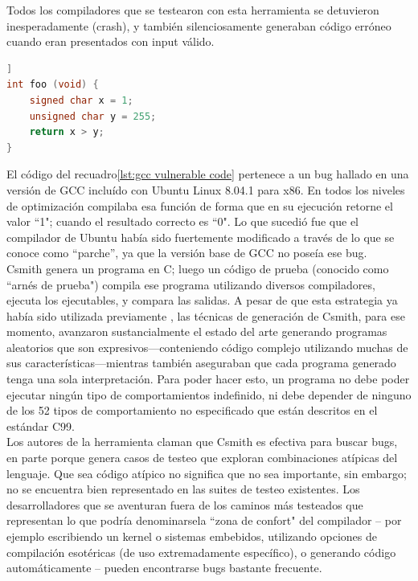 Todos los compiladores que se testearon con esta herramienta se detuvieron inesperadamente (crash), y también silenciosamente generaban código erróneo cuando eran presentados con input válido.\\

\begin{lstlisting}[language={c}, label={lst:gcc vulnerable code}, caption={Código que produjo bug en GCC}, captionpos={b}, frame={shadowbox}]]
int foo (void) {
    signed char x = 1;
    unsigned char y = 255;
    return x > y;
}
\end{lstlisting}

El código del recuadro\ref{lst:gcc vulnerable code} pertenece a un bug hallado en una versión de GCC incluído con Ubuntu Linux 8.04.1 para x86. En todos los niveles de optimización compilaba esa función  de forma que en su ejecución retorne el valor ``1"; cuando el resultado correcto es ``0". Lo que sucedió fue que el compilador de Ubuntu había sido fuertemente modificado a través de lo que se conoce como “parche”, ya que la versión base de GCC no poseía ese bug\cite{Yang:2011:FUB:1993316.1993532}.\\

Csmith genera un programa en C; luego un código de prueba (conocido como ``arnés de prueba") compila ese programa utilizando diversos compiladores, ejecuta los ejecutables, y compara las salidas. A pesar de que esta estrategia ya había sido utilizada previamente \cite{Eide:2008:VM:1450058.1450093}\cite{McKeeman98differentialtesting}\cite{Sheridan2007c99comparison}, las técnicas de generación de Csmith, para ese momento, avanzaron sustancialmente el estado del arte generando programas aleatorios que son expresivos—conteniendo código complejo utilizando muchas de sus características—mientras también aseguraban que cada programa generado tenga una sola interpretación. Para poder hacer esto, un programa no debe poder ejecutar ningún tipo de comportamientos indefinido, ni debe depender de ninguno de los 52 tipos de comportamiento no especificado que están descritos en el estándar C99\cite{openstdc99}.\\

Los autores de la herramienta claman que Csmith es efectiva para buscar bugs, en parte porque genera casos de testeo que exploran combinaciones atípicas del lenguaje. Que sea código atípico no significa que no sea importante, sin embargo; no se encuentra bien representado en las suites de testeo existentes. Los desarrolladores que se aventuran fuera de los caminos más testeados que representan lo que podría denominarsela ``zona de confort" del compilador -- por ejemplo escribiendo un kernel o sistemas embebidos, utilizando opciones de compilación esotéricas (de uso extremadamente específico), o generando código automáticamente -- pueden encontrarse bugs bastante frecuente.\\

